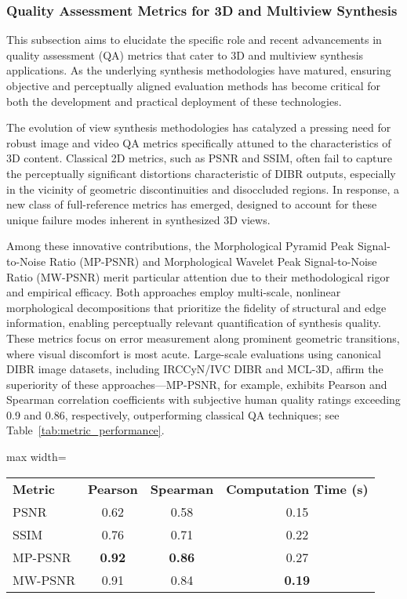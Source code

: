 \documentclass[sigconf]{acmart}
\begin{document}
\subsubsection{Quality Assessment Metrics for 3D and Multiview Synthesis}

This subsection aims to elucidate the specific role and recent advancements in quality assessment (QA) metrics that cater to 3D and multiview synthesis applications. As the underlying synthesis methodologies have matured, ensuring objective and perceptually aligned evaluation methods has become critical for both the development and practical deployment of these technologies.

The evolution of view synthesis methodologies has catalyzed a pressing need for robust image and video QA metrics specifically attuned to the characteristics of 3D content. Classical 2D metrics, such as PSNR and SSIM, often fail to capture the perceptually significant distortions characteristic of DIBR outputs, especially in the vicinity of geometric discontinuities and disoccluded regions. In response, a new class of full-reference metrics has emerged, designed to account for these unique failure modes inherent in synthesized 3D views.

Among these innovative contributions, the Morphological Pyramid Peak Signal-to-Noise Ratio (MP-PSNR) and Morphological Wavelet Peak Signal-to-Noise Ratio (MW-PSNR) merit particular attention due to their methodological rigor and empirical efficacy. Both approaches employ multi-scale, nonlinear morphological decompositions that prioritize the fidelity of structural and edge information, enabling perceptually relevant quantification of synthesis quality. These metrics focus on error measurement along prominent geometric transitions, where visual discomfort is most acute. Large-scale evaluations using canonical DIBR image datasets, including IRCCyN/IVC DIBR and MCL-3D, affirm the superiority of these approaches—MP-PSNR, for example, exhibits Pearson and Spearman correlation coefficients with subjective human quality ratings exceeding 0.9 and 0.86, respectively, outperforming classical QA techniques; see Table~\ref{tab:metric_performance}.

\begin{table*}[htbp]
\centering
\caption{Comparison of quality assessment metrics on DIBR image datasets.}
\label{tab:metric_performance}
\begin{adjustbox}{max width=\textwidth}
\begin{tabular}{lccc}
\toprule
\textbf{Metric} & \textbf{Pearson} & \textbf{Spearman} & \textbf{Computation Time (s)} \\
PSNR     & 0.62 & 0.58 & 0.15 \\
SSIM     & 0.76 & 0.71 & 0.22 \\
MP-PSNR  & \textbf{0.92} & \textbf{0.86} & 0.27 \\
MW-PSNR  & 0.91 & 0.84 & \textbf{0.19} \\
\bottomrule
\end{tabular}
\end{adjustbox}
\end{table*}
\end{document}
